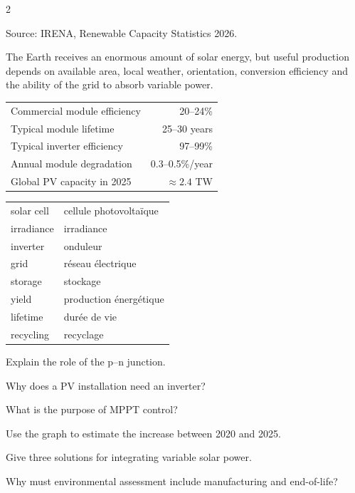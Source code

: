 \begin{multicols}{2}
\begin{tcolorbox}[colback=white,colframe=ECBlue,title=\sffamily\bfseries Global solar PV capacity]
{\scriptsize Source: IRENA, Renewable Capacity Statistics 2026.}
\end{tcolorbox}

\begin{tcolorbox}[colback=yellow!10,colframe=ECOrange,title=\sffamily\bfseries Engineering Insight]
The Earth receives an enormous amount of solar energy, but useful production depends on available area, local weather, orientation, conversion efficiency and the ability of the grid to absorb variable power.
\end{tcolorbox}

\begin{tcolorbox}[colback=ECLightBlue,colframe=ECBlue,title=\sffamily\bfseries Key Figures]
\begin{tabularx}{\linewidth}{@{}Xr@{}}
Commercial module efficiency & 20--24\%\\
Typical module lifetime & 25--30 years\\
Typical inverter efficiency & 97--99\%\\
Annual module degradation & 0.3--0.5\%/year\\
Global PV capacity in 2025 & $\approx 2.4$ TW
\end{tabularx}
\end{tcolorbox}

\begin{vocabulary}
\begin{tabularx}{\linewidth}{@{}lX@{}}
solar cell & cellule photovoltaïque\\
irradiance & irradiance\\
inverter & onduleur\\
grid & réseau électrique\\
storage & stockage\\
yield & production énergétique\\
lifetime & durée de vie\\
recycling & recyclage
\end{tabularx}
\end{vocabulary}

\begin{questions}
\item Explain the role of the p--n junction.
\item Why does a PV installation need an inverter?
\item What is the purpose of MPPT control?
\item Use the graph to estimate the increase between 2020 and 2025.
\item Give three solutions for integrating variable solar power.
\item Why must environmental assessment include manufacturing and end-of-life?
\end{questions}


\end{multicols}
